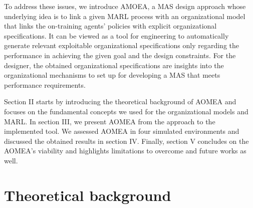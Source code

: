 
To address these issues, we introduce AMOEA, a MAS design approach whose underlying idea is to link a given MARL process with an organizational model that links the on-training agents' policies with explicit organizational specifications. It can be viewed as a tool for engineering to automatically generate relevant exploitable organizational specifications only regarding the performance in achieving the given goal and the design constraints. For the designer, the obtained organizational specifications are insights into the organizational mechanisms to set up for developing a MAS that meets performance requirements.



Section II starts by introducing the theoretical background of AOMEA and focuses on the fundamental concepts we used for the organizational models and MARL.
In section III, we present AOMEA from the approach to the implemented tool. We assessed AOMEA in four simulated environments and discussed the obtained results in section IV. Finally, section V concludes on the AOMEA's viability and highlights limitations to overcome and future works as well.


\section{Theoretical background}


